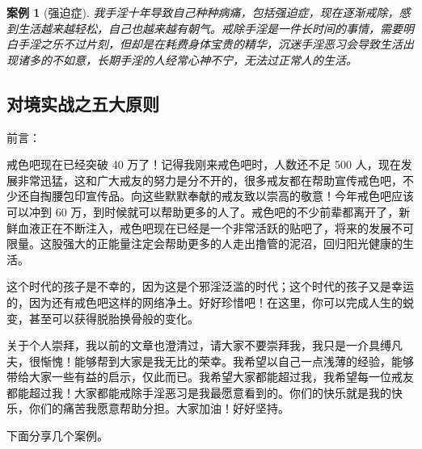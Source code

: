 \documentclass{ctexart}
\newtheorem{case}{案例}
\begin{document}
\begin{case}[强迫症]
    我手淫十年导致自己种种病痛，包括强迫症，现在逐渐戒除，感到生活越来越轻松，自己也越来越有朝气。戒除手淫是一件长时间的事情，需要明白手淫之乐不过片刻，但却是在耗费身体宝贵的精华，沉迷手淫恶习会导致生活出现诸多的不如意，长期手淫的人经常心神不宁，无法过正常人的生活。
\end{case}

\subsection{对境实战之五大原则}

前言：

戒色吧现在已经突破 40 万了！记得我刚来戒色吧时，人数还不足 500 人，现在发展非常迅猛，这和广大戒友的努力是分不开的，很多戒友都在帮助宣传戒色吧，不少还自掏腰包印宣传品。向这些默默奉献的戒友致以崇高的敬意！今年戒色吧应该可以冲到 60 万，到时候就可以帮助更多的人了。戒色吧的不少前辈都离开了，新鲜血液正在不断注入，戒色吧现在已经是一个非常活跃的贴吧了，将来的发展不可限量。这股强大的正能量注定会帮助更多的人走出撸管的泥沼，回归阳光健康的生活。

这个时代的孩子是不幸的，因为这是个邪淫泛滥的时代；这个时代的孩子又是幸运的，因为还有戒色吧这样的网络净土。好好珍惜吧！在这里，你可以完成人生的蜕变，甚至可以获得脱胎换骨般的变化。

关于个人崇拜，我以前的文章也澄清过，请大家不要崇拜我，我只是一介具缚凡夫，很惭愧！能够帮到大家是我无比的荣幸。我希望以自己一点浅薄的经验，能够带给大家一些有益的启示，仅此而已。我希望大家都能超过我，我希望每一位戒友都能超过我！大家都能戒除手淫恶习是我最愿意看到的。你们的快乐就是我的快乐，你们的痛苦我愿意帮助分担。大家加油！好好坚持。

下面分享几个案例。
\end{document}
